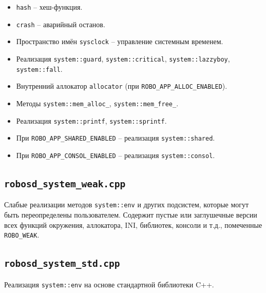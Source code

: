 \documentclass[a4paper,12pt]{article}
\begin{document}
\begin{itemize}
    \item \texttt{hash} -- хеш-функция.
    \item \texttt{crash} -- аварийный останов.
    \item Пространство имён \texttt{sysclock} -- управление системным временем.
    \item Реализация \texttt{system::guard}, \texttt{system::critical}, \texttt{system::lazzyboy}, \texttt{system::fall}.
    \item Внутренний аллокатор \texttt{allocator} (при \texttt{ROBO\_APP\_ALLOC\_ENABLED}).
    \item Методы \texttt{system::mem\_alloc\_}, \texttt{system::mem\_free\_}.
    \item Реализация \texttt{system::printf}, \texttt{system::sprintf}.
    \item При \texttt{ROBO\_APP\_SHARED\_ENABLED} -- реализация \texttt{system::shared}.
    \item При \texttt{ROBO\_APP\_CONSOL\_ENABLED} -- реализация \texttt{system::consol}.
\end{itemize}

\subsection{\texttt{robosd\_system\_weak.cpp}}

Слабые реализации методов \texttt{system::env} и других подсистем, которые могут быть переопределены пользователем. Содержит пустые или заглушечные версии всех функций окружения, аллокатора, INI, библиотек, консоли и т.д., помеченные \texttt{ROBO\_WEAK}.

\subsection{\texttt{robosd\_system\_std.cpp}}

Реализация \texttt{system::env} на основе стандартной библиотеки C++.
\end{document}

